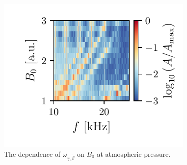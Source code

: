 \begin{figure}
    \centering
    \includegraphics{figures/rotational_mode_dependence_on_B0.pdf}
    \caption{The dependence of $\omega_{\gamma,\tilde\beta}$ on $B_0$ at atmospheric pressure.}
    \label{fig:rotational-mode-dependence-1bar}
\end{figure}
